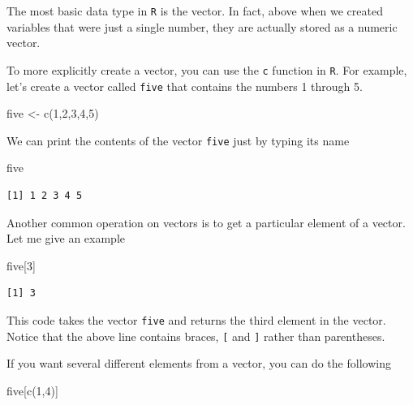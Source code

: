 \documentclass[
  letterpaper,
  DIV=11,
  numbers=noendperiod]{scrreprt}
\newenvironment{Shaded}{\begin{snugshade}}{\end{snugshade}}
\newcommand{\DecValTok}[1]{\textcolor[rgb]{0.68,0.00,0.00}{#1}}
\newcommand{\FunctionTok}[1]{\textcolor[rgb]{0.28,0.35,0.67}{#1}}
\newcommand{\NormalTok}[1]{\textcolor[rgb]{0.00,0.23,0.31}{#1}}
\newcommand{\OtherTok}[1]{\textcolor[rgb]{0.00,0.23,0.31}{#1}}
\begin{document}
The most basic data type in \texttt{R} is the vector. In fact, above
when we created variables that were just a single number, they are
actually stored as a numeric vector.

To more explicitly create a vector, you can use the \texttt{c} function
in \texttt{R}. For example, let's create a vector called \texttt{five}
that contains the numbers 1 through 5.

\begin{Shaded}
\begin{Highlighting}[]
\NormalTok{  five }\OtherTok{\textless{}{-}} \FunctionTok{c}\NormalTok{(}\DecValTok{1}\NormalTok{,}\DecValTok{2}\NormalTok{,}\DecValTok{3}\NormalTok{,}\DecValTok{4}\NormalTok{,}\DecValTok{5}\NormalTok{)}
\end{Highlighting}
\end{Shaded}

We can print the contents of the vector \texttt{five} just by typing its
name

\begin{Shaded}
\begin{Highlighting}[]
\NormalTok{five}
\end{Highlighting}
\end{Shaded}

\begin{verbatim}
[1] 1 2 3 4 5
\end{verbatim}

Another common operation on vectors is to get a particular element of a
vector. Let me give an example

\begin{Shaded}
\begin{Highlighting}[]
\NormalTok{five[}\DecValTok{3}\NormalTok{]}
\end{Highlighting}
\end{Shaded}

\begin{verbatim}
[1] 3
\end{verbatim}

This code takes the vector \texttt{five} and returns the third element
in the vector. Notice that the above line contains braces, \texttt{{[}}
and \texttt{{]}} rather than parentheses.

If you want several different elements from a vector, you can do the
following

\begin{Shaded}
\begin{Highlighting}[]
\NormalTok{five[}\FunctionTok{c}\NormalTok{(}\DecValTok{1}\NormalTok{,}\DecValTok{4}\NormalTok{)]}
\end{Highlighting}
\end{Shaded}
\end{document}
